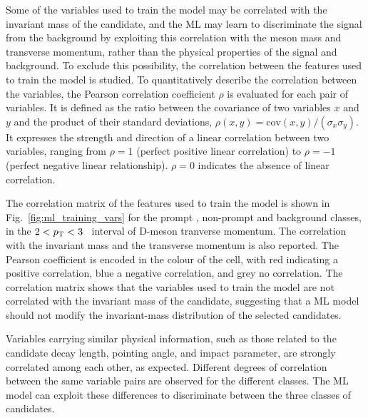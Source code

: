 Some of the variables used to train the model may be correlated with the invariant mass of the candidate, and the ML may learn to discriminate the signal from the background by exploiting this correlation with the \ds meson mass and transverse momentum, rather than the physical properties of the signal and background. To exclude this possibility, the correlation between the features used to train the model is studied. To quantitatively describe the correlation between the variables, the Pearson correlation coefficient $\rho$ is evaluated for each pair of variables. It is defined as the ratio between the covariance of two variables $x$ and $y$ and the product of their standard deviations, $\rho(x,y) = \mathrm{cov}(x,y)/(\sigma_{x}\sigma_{y})$. It expresses the strength and direction of a linear correlation between two variables, ranging from $\rho = 1$ (perfect positive linear correlation) to $\rho = -1$ (perfect negative linear relationship). $\rho = 0$ indicates the absence of linear correlation.


\begin{sloppypar}
The correlation matrix of the features used to train the model is shown in Fig.~\ref{fig:ml_training_vars} for the prompt \ds, non-prompt \ds and background classes, in the \mbox{$2<p_\mathrm{T}<3$~\gevc} interval of D-meson tranverse momentum. The correlation with the invariant mass and the transverse momentum is also reported. The Pearson coefficient is encoded in the colour of the cell, with red indicating a positive correlation, blue a negative correlation, and grey no correlation. The correlation matrix shows that the variables used to train the model are not correlated with the invariant mass of the candidate, suggesting that a ML model should not modify the invariant-mass distribution of the selected candidates.
\end{sloppypar}

Variables carrying similar physical information, such as those related to the candidate decay length, pointing angle, and impact parameter, are strongly correlated among each other, as expected. Different degrees of correlation between the same variable pairs are observed for the different classes. The ML model can exploit these differences to discriminate between the three classes of candidates.


